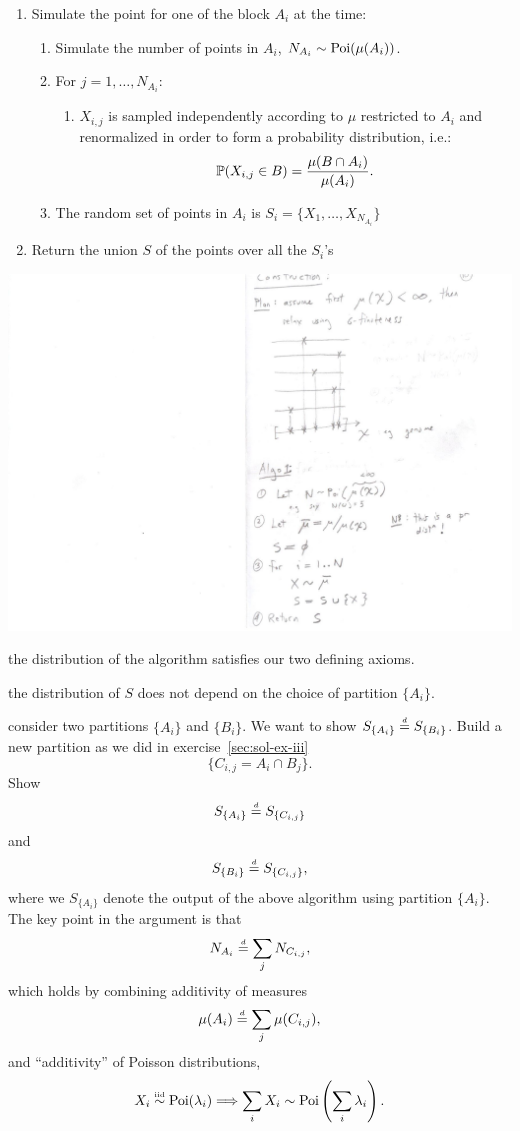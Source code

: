 \documentclass{article}
\begin{document}
\begin{enumerate}
  \item Simulate the point for one of the block $A_i$ at the time:
  \begin{enumerate}
    \item Simulate the number of points in $A_i$, $N_{A_i} \sim \Poi(\mu(A_i))$.
    \item For $j = 1, \dots, N_{A_i}$:
    \begin{enumerate}
      \item $X_{i,j}$ is sampled independently according to $\mu$ restricted to $A_i$ and renormalized in order to form a probability distribution, i.e.:
      \[ \P(X_{i,j} \in B) = \frac{\mu(B \cap A_i)}{\mu(A_i)}. \]
    \end{enumerate}
    \item The random set of points in $A_i$ is $S_i = \{X_1, \dots, X_{N_{A_i}}\}$
  \end{enumerate}
  \item Return the union $S$ of the points over all the $S_i$'s
\end{enumerate}
\begin{center}
	\includegraphics[width=0.5\linewidth]{figures/pp-algo} 
\end{center}

 the distribution of the algorithm satisfies our two defining axioms. 

 the distribution of $S$ does not depend on the choice of partition $\{A_i\}$.

 consider two partitions $\{A_i\}$ and $\{B_i\}$. We want to show $S_{\{A_i\}} \deq S_{\{B_i\}}$. Build a new partition as we did in exercise~\ref{sec:sol-ex-iii} 
\[ \{ C_{i,j} = A_i \cap B_j \}. \]
Show 
\[ S_{\{A_i\}} \deq S_{\{C_{i,j}\}} \]
and 
\[ S_{\{B_i\}} \deq S_{\{C_{i,j}\}}, \]
where we $S_{\{A_i\}}$ denote the output of the above algorithm using partition $\{A_i\}$.
The key point in the argument is that
\[ N_{A_i} \deq \sum_j N_{C_{i,j}}, \]
which holds by combining additivity of measures
\[ \mu(A_i) \deq \sum_j \mu(C_{i,j}),  \]
and ``additivity'' of Poisson distributions, 
\[ X_i \iidsim \Poi(\lambda_i) \Longrightarrow \sum_i X_i \sim \Poi\left(\sum_i \lambda_i\right). \]
\end{document}
